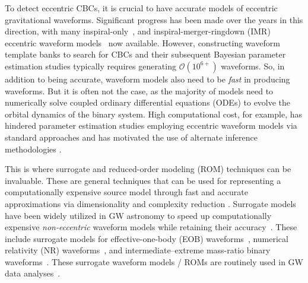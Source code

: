 \documentclass[reprint, superscriptaddress, amsmath, amssymb, aps, prl floatfix]{revtex4-2}
\begin{document}
To detect eccentric CBCs, it is crucial to have accurate models of eccentric gravitational waveforms.
Significant progress has been made over the years in this direction, with many inspiral-only~\citep{Yunes:2009yz, Cornish:2010cd, ShapiroKey:2010cnz, Huerta:2014eca, Tanay:2016zog, Loutrel:2017fgu, Tiwari:2019jtz, Tiwari:2020hsu, Moore:2018kvz, Moore:2019xkm, Sridhar:2024zms, Klein:2018ybm, Klein:2021jtd, Morras:2025nlp}, and inspiral-merger-ringdown (IMR) eccentric waveform models~\citep{Huerta:2016rwp, Huerta:2017kez, Chen:2020lzc, Paul:2024ujx, Hinder:2017sxy, Chattaraj:2022tay, Manna:2024ycx, Cao:2017ndf, Liu:2019jpg, Liu:2021pkr, Liu:2023dgl, Chiaramello:2020ehz, Nagar:2021gss, Gamba:2024cvy, Nagar:2024dzj, Ramos-Buades:2021adz, Gamboa:2024hli, Planas:2025feq, Setyawati:2021gom, Wang:2023ueg, Islam:2024tcs, Islam:2024bza, Islam:2024zqo} now available.
However, constructing waveform template banks to search for CBCs and their subsequent Bayesian parameter estimation studies typically requires generating $\mathcal{O}(10^{6+})$ waveforms. So, in addition to being accurate, waveform models also need to be \textit{fast} in producing waveforms. But it is often not the case, as the majority of models need to numerically solve coupled ordinary differential equations (ODEs) to evolve the orbital dynamics of the binary system. High computational cost, for example, has hindered parameter estimation studies employing eccentric waveform models via standard approaches \cite{Romero-Shaw:2021ual, Romero-Shaw:2022xko, Romero-Shaw:2020thy} and has motivated the use of alternate inference methodologies \cite{Gupte:2024jfe}.

This is where surrogate and reduced-order modeling (ROM) techniques can be invaluable. These are general techniques that can be used for representing a computationally expensive source model through fast and accurate approximations via dimensionality and complexity reduction \cite{Lumley1967, Sacks1989, Box1951, Simpson2001, Forrester2008}. Surrogate models have been widely utilized in GW astronomy to speed up computationally expensive \textit{non-eccentric} waveform models while retaining their accuracy~\citep{Field:2013cfa, Purrer:2014fza, Purrer:2015tud, Lackey:2016krb, Lackey:2018zvw, Cotesta:2020qhw, Khan:2020fso, Nousi:2021arn, Gadre:2022sed, Thomas:2022rmc, Blackman:2015pia, Blackman:2017dfb, Blackman:2017pcm, Varma:2018mmi, Varma:2019csw, Williams:2019vub, Yoo:2023spi, Rifat:2019ltp, Islam:2022laz, Rink:2024swg, Kumar:2018hml, Varma:2018aht, Haegel:2019uop, Boschini:2023ryi, Thomas:2025rje, Deka:2025vzx, DaRe:2025glj, Doctor:2017csx, Chua:2018woh}. These include surrogate models for effective-one-body (EOB) waveforms~\citep{Purrer:2014fza, Purrer:2015tud, Lackey:2016krb, Lackey:2018zvw, Cotesta:2020qhw, Khan:2020fso, Nousi:2021arn, Gadre:2022sed, Thomas:2022rmc}, numerical relativity (NR) waveforms~\citep{Blackman:2015pia, Blackman:2017dfb, Blackman:2017pcm, Varma:2018mmi, Varma:2019csw, Williams:2019vub, Yoo:2023spi}, and intermediate--extreme mass-ratio binary waveforms~\citep{Rifat:2019ltp, Islam:2022laz, Rink:2024swg}. These surrogate waveform models / ROMs are routinely used in GW data analyses~\cite{LIGOScientific:2018mvr, LIGOScientific:2020ibl, KAGRA:2021vkt, LIGOScientific:2025slb}.
\end{document}
